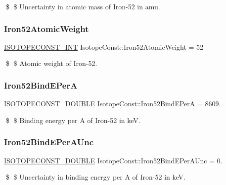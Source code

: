 \$ \$ Uncertainty in atomic mass of Iron-\/52 in amu. \mbox{\label{group___isotope_const-_iron-_fe52_ga25826a3f5f36b53561bca3b4fa711b23}} 
\subsubsection{\texorpdfstring{Iron52\+Atomic\+Weight}{Iron52AtomicWeight}}
{\footnotesize\ttfamily \mbox{\hyperlink{group___isotope_const-_macros_ga5f18360b3e99483a35c32d789e62621c}{I\+S\+O\+T\+O\+P\+E\+C\+O\+N\+S\+T\+\_\+\+I\+NT}} Isotope\+Const\+::\+Iron52\+Atomic\+Weight = 52}

\$ \$ Atomic weight of Iron-\/52. \mbox{\label{group___isotope_const-_iron-_fe52_ga71512877087382f04efefe69dea096ef}} 
\subsubsection{\texorpdfstring{Iron52\+Bind\+E\+PerA}{Iron52BindEPerA}}
{\footnotesize\ttfamily \mbox{\hyperlink{group___isotope_const-_macros_ga8f45a7272ce02c0b4c65c44636ed719a}{I\+S\+O\+T\+O\+P\+E\+C\+O\+N\+S\+T\+\_\+\+D\+O\+U\+B\+LE}} Isotope\+Const\+::\+Iron52\+Bind\+E\+PerA = 8609.}

\$ \$ Binding energy per A of Iron-\/52 in keV. \mbox{\label{group___isotope_const-_iron-_fe52_ga191497c9e96fdda99a7ca58c4aae4a7b}} 
\subsubsection{\texorpdfstring{Iron52\+Bind\+E\+Per\+A\+Unc}{Iron52BindEPerAUnc}}
{\footnotesize\ttfamily \mbox{\hyperlink{group___isotope_const-_macros_ga8f45a7272ce02c0b4c65c44636ed719a}{I\+S\+O\+T\+O\+P\+E\+C\+O\+N\+S\+T\+\_\+\+D\+O\+U\+B\+LE}} Isotope\+Const\+::\+Iron52\+Bind\+E\+Per\+A\+Unc = 0.}

\$ \$ Uncertainty in binding energy per A of Iron-\/52 in keV. \mbox{\label{group___isotope_const-_iron-_fe52_ga75805aa2bcd4a49fd51d0b4dbc642b1d}} 
